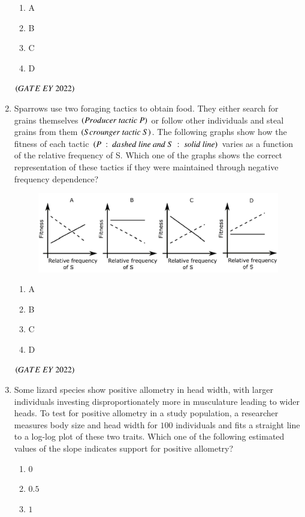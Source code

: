 \documentclass[journal]{IEEEtran}
\numberwithin{equation}{enumi}
\numberwithin{figure}{enumi}
\begin{document}
\begin{enumerate}
\begin{figure}[H]
    \caption{}
    \label{fig:11}
   \end{figure}
    \begin{enumerate}
        \item  A
        \item  B
        \item  C
        \item  D
    \end{enumerate}
    \hfill{$\brak{ GATE\ EY\ 2022}$}
    \bigskip
 \item Sparrows use two foraging tactics to obtain food. They either search for grains
themselves $\brak{Producer\ tactic\ P}$ or follow other individuals and steal grains from them
$\left(Scrounger\ tactic\ S\right)$. The following graphs show how the fitness of each tactic
$\brak{P\ :\ dashed\ line\ and\ S\ :\ solid\ line}$ varies as a function of the relative frequency of S.
Which one of the graphs shows the correct representation of these tactics if they were
maintained through negative frequency dependence?
\begin{figure}[H]
    \centering
\includegraphics[width=0.5\columnwidth]{figs/12.png}
    \caption{}
    \label{fig:12}
   \end{figure}
    \begin{enumerate}
        \item  A
        \item  B
        \item  C
        \item  D
    \end{enumerate}
    \hfill{$\brak{ GATE\ EY\ 2022}$}
    \bigskip
 \item Some lizard species show positive allometry in head width, with larger individuals
investing disproportionately more in musculature leading to wider heads. To test for
positive allometry in a study population, a researcher measures body size and head
width for $100$ individuals and fits a straight line to a log-log plot of these two traits.
Which one of the following estimated values of the slope indicates support for
positive allometry?
    \begin{enumerate}
        \item  $0$
        \item  $0.5$
        \item  $1$

\end{enumerate}
\end{enumerate}
\end{document}
